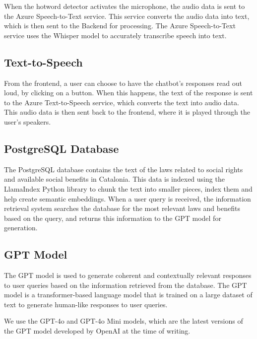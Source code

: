 \documentclass[a4paper,12pt,twoside]{ThesisStyle}
\begin{document}
When the hotword detector activates the microphone, the audio data is sent to the Azure Speech-to-Text service. This service converts the audio data into text, which is then sent to the Backend for processing. The Azure Speech-to-Text service uses the Whisper \cite{Radford2022RobustSpeechRecognitionLargeScale} model to accurately transcribe speech into text.

\subsection{Text-to-Speech}
\label{subsec:text_to_speech}

From the frontend, a user can choose to have the chatbot's responses read out loud, by clicking on a button. When this happens, the text of the response is sent to the Azure Text-to-Speech service, which converts the text into audio data. This audio data is then sent back to the frontend, where it is played through the user's speakers.

\subsection{PostgreSQL Database}
\label{subsec:database}

The PostgreSQL database contains the text of the laws related to social rights and available social benefits in Catalonia. This data is indexed using the LlamaIndex Python library to chunk the text into smaller pieces, index them and  help create semantic embeddings. When a user query is received, the information retrieval system searches the database for the most relevant laws and benefits based on the query, and returns this information to the GPT model for generation.

\subsection{GPT Model}
\label{subsec:gpt_model}

The GPT model is used to generate coherent and contextually relevant responses to user queries based on the information retrieved from the database. The GPT model is a transformer-based \cite{Vaswani2023AttentionNeed} language model that is trained on a large dataset of text to generate human-like responses to user queries.

We use the GPT-4o and GPT-4o Mini models, which are the latest versions of the GPT model developed by OpenAI at the time of writing.
\end{document}
